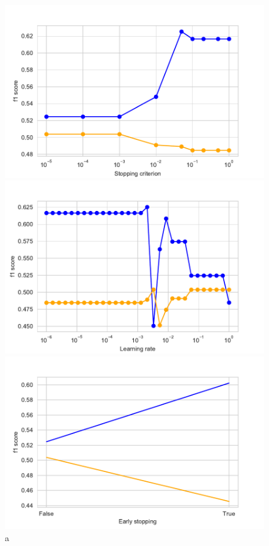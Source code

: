 \documentclass[11pt]{article}
\begin{document}
\begin{figure}[h]
\begin{minipage}[l]{0.33\textwidth}
\end{minipage}
\begin{minipage}[l]{0.33\textwidth}
\includegraphics[width=1\linewidth]{bridges/tol_ppn.pdf}
\end{minipage}
\begin{minipage}[l]{0.33\textwidth}
\includegraphics[width=1\linewidth]{bridges/learning_rate_ppn.pdf}
\end{minipage}
\begin{minipage}[l]{0.33\textwidth}
\includegraphics[width=1.1\linewidth]{bridges/early_stopping_ppn.pdf}
\end{minipage}
\caption{a}
\label{Fig:: PPN_result_manual parameter_tuning}
\end{figure}
\end{document}
